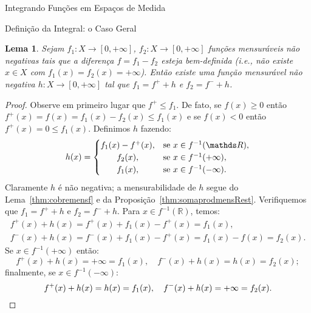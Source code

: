 \documentclass[oneside,final,11pt]{amsbook}
\newcommand{\R}{\mathds R}
\theoremstyle{remark}\newtheorem{exercise}{Exercício}[chapter]
\theoremstyle{remark}\newtheorem{*exercise}[exercise]{\hbox to 0pt{\hskip 0pt minus 1fil*}Exercício}
\theoremstyle{definition}\newtheorem{exdefin}{Definição}[chapter]
\theoremstyle{plain}\newtheorem{teo}{Teorema}[section]
\theoremstyle{plain}\newtheorem{lem}[teo]{Lema}
\theoremstyle{plain}\newtheorem{prop}[teo]{Proposição}
\theoremstyle{plain}\newtheorem{cor}[teo]{Corolário}
\theoremstyle{definition}\newtheorem{defin}[teo]{Definição}
\theoremstyle{remark}\newtheorem{rem}[teo]{Observação}
\theoremstyle{definition}\newtheorem{notation}[teo]{Notação}
\theoremstyle{definition}\newtheorem{convention}[teo]{Convenção}
\theoremstyle{definition}\newtheorem{example}[teo]{Exemplo}
\numberwithin{section}{chapter}
\numberwithin{equation}{section}
\begin{document}
\begin{chapter}{Integrando Funções em Espaços de Medida}
\begin{section}{Definição da Integral: o Caso Geral}
\begin{lem}\label{thm:fmaismenosdecompminima}
Sejam $f_1:X\to[0,+\infty]$, $f_2:X\to[0,+\infty]$ funções mensuráveis não negativas tais que
a diferença $f=f_1-f_2$ esteja bem-definida (i.e., não existe $x\in X$ com $f_1(x)=f_2(x)=+\infty$).
Então existe uma função mensurável não negativa $h:X\to[0,+\infty]$ tal que
$f_1=f^++h$ e $f_2=f^-+h$.
\end{lem}
\begin{proof}
Observe em primeiro lugar que $f^+\le f_1$. De fato, se $f(x)\ge0$ então
$f^+(x)=f(x)=f_1(x)-f_2(x)\le f_1(x)$ e se $f(x)<0$ então $f^+(x)=0\le f_1(x)$. Definimos $h$ fazendo:
\[h(x)=\begin{cases}
f_1(x)-f^+(x),&\text{se $x\in f^{-1}(\R)$},\\
\hfil f_2(x),&\text{se $x\in f^{-1}(+\infty)$},\\
\hfil f_1(x),&\text{se $x\in f^{-1}(-\infty)$}.
\end{cases}\]
Claramente $h$ é não negativa; a mensurabilidade de $h$ segue do Lema~\ref{thm:cobremensf}
e da Proposição~\ref{thm:somaprodmensRest}. Verifiquemos que $f_1=f^++h$ e $f_2=f^-+h$.
Para $x\in f^{-1}(\R)$, temos:
\begin{gather*}
f^+(x)+h(x)=f^+(x)+f_1(x)-f^+(x)=f_1(x),\\
f^-(x)+h(x)=f^-(x)+f_1(x)-f^+(x)=f_1(x)-f(x)=f_2(x).
\end{gather*}
Se $x\in f^{-1}(+\infty)$ então:
\[f^+(x)+h(x)=+\infty=f_1(x),\quad f^-(x)+h(x)=h(x)=f_2(x);\]
finalmente, se $x\in f^{-1}(-\infty)$:
\[f^+(x)+h(x)=h(x)=f_1(x),\quad f^-(x)+h(x)=+\infty=f_2(x).\qedhere\]
\end{proof}


\end{section}
\end{chapter}
\end{document}
